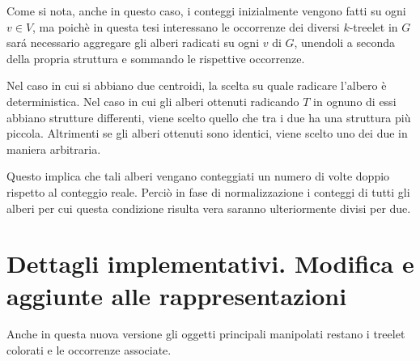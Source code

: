 Come si nota, anche in questo caso, i conteggi inizialmente vengono fatti su ogni $ v \in V $, ma poich\`e in questa tesi interessano le occorrenze dei diversi $ k $-treelet in $ G $  sar\'a necessario aggregare gli alberi radicati su ogni $ v $ di $ G $, unendoli a seconda della propria struttura e sommando le rispettive occorrenze.

Nel caso in cui si abbiano due centroidi, la scelta su quale radicare l'albero  \`e deterministica. %
Nel caso in cui gli alberi ottenuti radicando $ T $ in ognuno di essi abbiano strutture differenti, viene scelto quello che tra i due ha una struttura pi\`u piccola.
Altrimenti se gli alberi ottenuti sono identici, viene scelto uno dei due in maniera arbitraria.  %


Questo implica che tali alberi vengano conteggiati un numero di volte doppio rispetto al conteggio reale. %
Perci\`o in fase di normalizzazione i conteggi di tutti gli alberi per cui questa condizione risulta vera saranno ulteriormente divisi per due.


\section{Dettagli implementativi. Modifica e aggiunte alle rappresentazioni}
\label{cap 3:3}
Anche in questa nuova versione gli oggetti principali manipolati restano i treelet colorati e le occorrenze associate.

